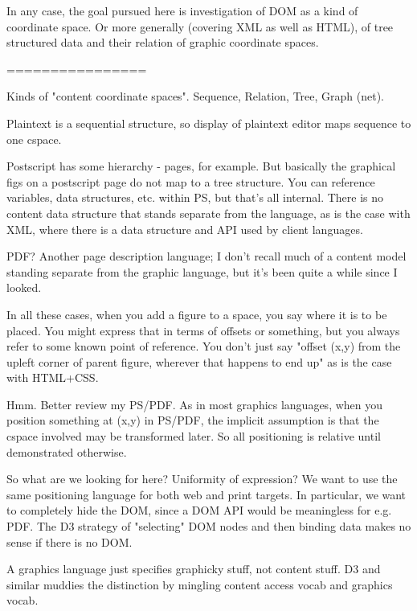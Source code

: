 \documentclass[12pt]{tufte-handout}
\numberwithin{equation}{subsection}
\numberwithin{equation}{subsection}
\begin{document}
{  In any case, the goal pursued here is investigation of DOM as a kind
  of coordinate space.  Or more generally (covering XML as well as
  HTML), of tree structured data and their relation of graphic
  coordinate spaces.


  ================

  Kinds of "content coordinate spaces".  Sequence, Relation, Tree, Graph
  (net).

  Plaintext is a sequential structure, so display of plaintext editor
  maps sequence to one cspace.

  Postscript has some hierarchy - pages, for example.  But basically the
  graphical figs on a postscript page do not map to a tree structure.
  You can reference variables, data structures, etc. within PS, but
  that's all internal.  There is no content data structure that stands
  separate from the language, as is the case with XML, where there is a
  data structure and API used by client languages.

  PDF?  Another page description language; I don't recall much of a
  content model standing separate from the graphic language, but it's
  been quite a while since I looked.

  In all these cases, when you add a figure to a space, you say where it
  is to be placed.  You might express that in terms of offsets or
  something, but you always refer to some known point of reference.  You
  don't just say "offset (x,y) from the upleft corner of parent
  figure, wherever that happens to end up" as is the case with HTML+CSS.

  Hmm.  Better review my PS/PDF.  As in most graphics languages, when
  you position something at (x,y) in PS/PDF, the implicit assumption is
  that the cspace involved may be transformed later.  So all positioning
  is relative until demonstrated otherwise.

  So what are we looking for here?  Uniformity of expression?  We want
  to use the same positioning language for both web and print targets.
  In particular, we want to completely hide the DOM, since a DOM API
  would be meaningless for e.g. PDF.  The D3 strategy of "selecting" DOM
  nodes and then binding data makes no sense if there is no DOM.

  A graphics language just specifies graphicky stuff, not content stuff.
  D3 and similar muddies the distinction by mingling content access
  vocab and graphics vocab.

}
\end{document}
